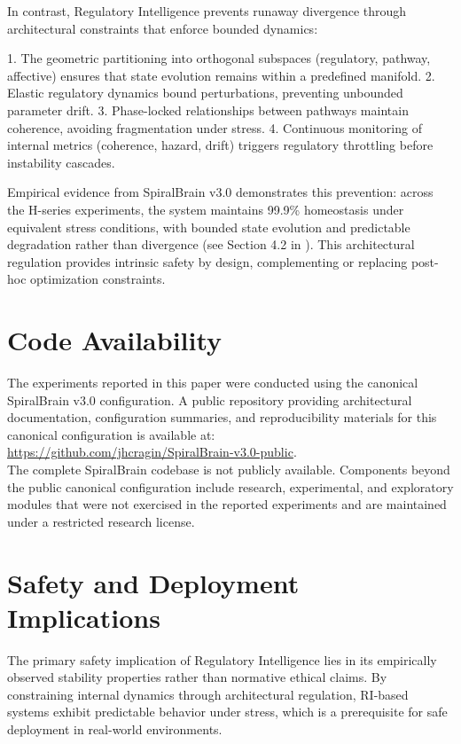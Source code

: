 \documentclass[12pt,a4paper]{report}
\begin{document}
In contrast, Regulatory Intelligence prevents runaway divergence through architectural constraints that enforce bounded dynamics:

1. The geometric partitioning into orthogonal subspaces (regulatory, pathway, affective) ensures that state evolution remains within a predefined manifold.
2. Elastic regulatory dynamics bound perturbations, preventing unbounded parameter drift.
3. Phase-locked relationships between pathways maintain coherence, avoiding fragmentation under stress.
4. Continuous monitoring of internal metrics (coherence, hazard, drift) triggers regulatory throttling before instability cascades.

Empirical evidence from SpiralBrain v3.0 demonstrates this prevention: across the H-series experiments, the system maintains 99.9\% homeostasis under equivalent stress conditions, with bounded state evolution and predictable degradation rather than divergence (see Section 4.2 in \cite{Cragin2026RI}). This architectural regulation provides intrinsic safety by design, complementing or replacing post-hoc optimization constraints.

\section{Code Availability}

The experiments reported in this paper were conducted using the canonical SpiralBrain v3.0 configuration.
A public repository providing architectural documentation, configuration summaries, and reproducibility materials for this canonical configuration is available at: \\
\url{https://github.com/jhcragin/SpiralBrain-v3.0-public}. \\

The complete SpiralBrain codebase is not publicly available. Components beyond the public canonical configuration include research, experimental, and exploratory modules that were not exercised in the reported experiments and are maintained under a restricted research license.

\section{Safety and Deployment Implications}

The primary safety implication of Regulatory Intelligence lies in its empirically observed stability properties rather than normative ethical claims. By constraining internal dynamics through architectural regulation, RI-based systems exhibit predictable behavior under stress, which is a prerequisite for safe deployment in real-world environments.
\end{document}
